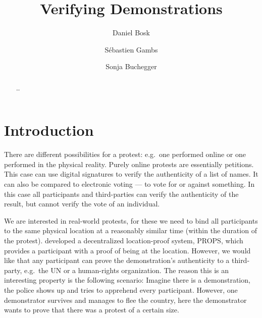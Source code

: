\title{%
  Verifying Demonstrations
}
\author[D.~Bosk et al.]{%
  Daniel Bosk
  \and
  Sébastien Gambs
  \and
  Sonja Buchegger
}

\maketitle

\mode*

\begin{abstract}
  \dots

  \keywords{\dots}
\end{abstract}



\section{Introduction}
\label{Introduction}

There are different possibilities for a protest: e.g.\ one performed online or 
one performed in the physical reality.
Purely online protests are essentially petitions.
This case can use digital signatures to verify the authenticity of a list of 
names.
It can also be compared to electronic voting --- to vote for or against 
something.
In this case all participants and third-parties can verify the authenticity of 
the result, but cannot verify the vote of an individual.

We are interested in real-world protests, for these we need to bind all 
participants to the same physical location at a reasonably similar time (within 
the duration of the protest).
\citeauthor{PROPS} developed a decentralized location-proof system, \ac{PROPS}, 
which provides a participant with a proof of being at the location.
However, we would like that any participant can prove the demonstration's 
authenticity to a third-party, e.g.\ the UN or a human-rights 
organization.
The reason this is an interesting property is the following scenario:
Imagine there is a demonstration, the police shows up and tries to apprehend 
every participant.
However, one demonstrator survives and manages to flee the country, here the 
demonstrator wants to prove that there was a protest of a certain size.

